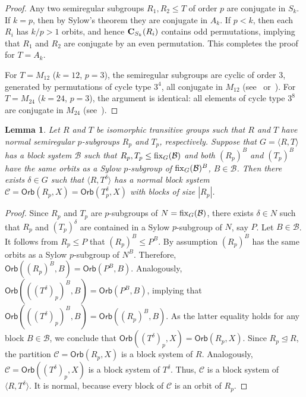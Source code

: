 \documentclass[11pt]{amsart}
\numberwithin{equation}{section}
\newtheorem{lem}[thrm]{Lemma}
\theoremstyle{definition}
\def\fix{{\rm fix}}
\def\la{\langle}
\def\ra{\rangle}
\begin{document}
	\begin{proof}
		Any two semiregular subgroups $R_1, R_2 \le T$ of order $p$ are conjugate in $S_k$. 
		If $k = p$, then by Sylow’s theorem they are conjugate in $A_k$. 
		If $p < k$, then each $R_i$ has $k/p > 1$ orbits, and hence 
		${\bf C}_{S_k}(R_i)$ contains odd permutations, implying that $R_1$ and $R_2$ are conjugate by an even permutation. 
		This completes the proof for $T = A_k$.
		
		For $T = M_{12}$ ($k = 12$, $p = 3$), the semiregular subgroups are cyclic of order $3$, 
		generated by permutations of cycle type $3^4$, all conjugate in $M_{12}$ 
		(see~\cite{BuekenhoutR1988} or~\cite{Atlas}).  
		For $T = M_{24}$ ($k = 24$, $p = 3$), the argument is identical: 
		all elements of cycle type $3^8$ are conjugate in $M_{24}$ (see~\cite{Atlas}).
	\end{proof}
	\begin{lem}\label{2pbottom} Let $R$ and  $T$ be isomorphic transitive groups such that $R$ and $T$ have normal semiregular $p$-subgroups $R_p$ and $T_p$, respectively. Suppose that $G=\la R,T\ra$ has a block system ${\mathcal B}$ such that $R_p,T_p\le\fix_{G}({\mathcal B})$ and both $(R_p)^B$ and $(T_p)^B$ have the same orbits as a Sylow $p$-subgroup of $\fix_{G}({\mathcal B})^B$, $B\in{\mathcal B}$. Then there exists $\delta\in G$ such that $\la R, T^\delta\ra$ has a normal block system ${\mathcal C}=\mathsf{Orb}(R_p,X) = \mathsf{Orb}(T^\delta_p,X) $ with blocks of size $|R_p|$. \end{lem}
	
	
	\begin{proof}
		Since $R_p$ and $T_p$ are $p$-subgroups of $N = \fix_G({\mathcal  B})$, there exists $\delta\in N$ such that $R_p$ and $(T_p)^\delta$ are contained in a Sylow $p$-subgroup of $N$, say $P$. Let $B\in{\mathcal  B}$. It follows from $R_p\leq P$ that $(R_p)^B\leq P^B$. By assumption $(R_p)^B$ has the same orbits as a Sylow $p$-subgroup of $N^B$. Therefore, $\mathsf{Orb}((R_p)^B,B)=\mathsf{Orb}(P^B,B)$. Analogously,  $\mathsf{Orb}(((T^\delta)_p)^B,B) = \mathsf{Orb}(P^B,B)$, implying that $\mathsf{Orb}(((T^\delta)_p)^B,B) = \mathsf{Orb}((R_p)^B,B)$.  As the latter equality holds for any block $B\in{\mathcal  B}$, we conclude that $\mathsf{Orb}((T^\delta)_p,X) = \mathsf{Orb}(R_p,X)$. Since $R_p\unlhd R$, the partition ${\mathcal  C} = \mathsf{Orb}(R_p,X)$ is a block system of $R$. Analogously, ${\mathcal  C} = \mathsf{Orb}((T^\delta)_p,X)$ is a block system of  $T^\delta$.  Thus, ${\mathcal  C}$ is a block system of $\la R, T^\delta\ra$. It is normal, because every block of ${\mathcal  C}$ is an orbit of $R_p$.
	\end{proof}
	
\end{document}
